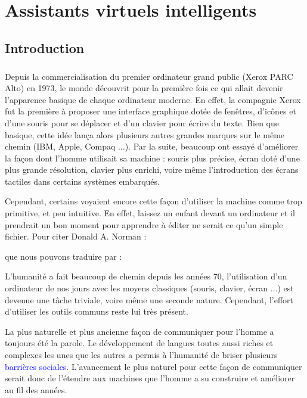 \chapter{Assistants virtuels intelligents}

\section{Introduction}
\paragraph{}
Depuis la commercialisation du premier ordinateur grand public (Xerox PARC Alto) en 1973, le monde découvrit pour la première fois ce qui allait devenir l'apparence basique de chaque ordinateur moderne. En effet, la compagnie Xerox fut la première à proposer une interface graphique dotée de fenêtres, d'icônes et d'une souris pour se déplacer et d'un clavier pour écrire du texte. Bien que basique, cette idée lança alors plusieurs autres grandes marques sur le même chemin (IBM, Apple, Compaq ...). Par la suite, beaucoup ont essayé d'améliorer la façon dont l'homme utilisait sa machine : souris plus précise, écran doté d'une plus grande résolution, clavier plus enrichi, voire même l'introduction des écrans tactiles dans certains systèmes embarqués.
\par Cependant, certains voyaient encore cette façon d'utiliser la machine comme trop primitive, et peu intuitive. En effet, laissez un enfant devant un ordinateur et il prendrait un bon moment pour apprendre à éditer ne serait ce qu'un simple fichier. Pour citer Donald A. Norman \citep{don_norman} :
\begin{quote}
\end{quote}
que nous pouvons traduire par :
\begin{quote}
\end{quote} 
L'humanité a fait beaucoup de chemin depuis les années 70, l'utilisation d'un ordinateur de nos jours avec les moyens classiques (souris, clavier, écran ...) est devenue une tâche triviale, voire même une seconde nature. Cependant, l'effort d'utiliser les outils communs reste lui très présent.
\par La plus naturelle et plus ancienne façon de communiquer pour l'homme a toujours été la parole. Le développement de langues toutes aussi riches et complexes les unes que les autres a permis à l'humanité de briser plusieurs \textcolor{blue}{barrières sociales}. L'avancement le plus naturel pour cette façon de communiquer serait donc de l'étendre aux machines que l'homme a su construire et améliorer au fil des années.
